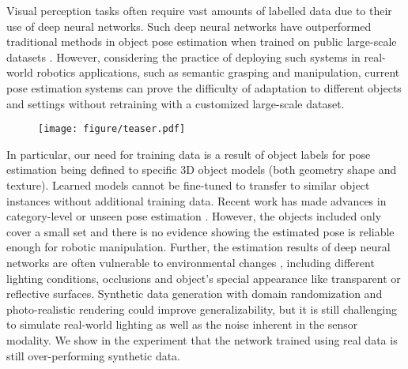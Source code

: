 
Visual perception tasks often require vast amounts of labelled data due to their use of deep neural networks.   Such deep neural networks have outperformed traditional methods in object pose estimation \cite{labbe2020cosypose, he2021ffb6d, hodavn2020bop} when trained on public large-scale datasets \cite{xiang2017posecnn, hodan2017tless, hinterstoisser2012model}. 
However, considering the practice of deploying such systems in real-world robotics applications, such as semantic grasping and manipulation, current pose estimation systems can prove the difficulty of adaptation to different objects and settings without retraining with a customized large-scale dataset.

\begin{figure}
    \centering
    \captionsetup{type=figure}
    \texttt{[image: figure/teaser.pdf]}
    \label{fig:teaser}
\end{figure}

In particular, our need for training data is a result of object labels for pose estimation being defined to specific 3D object models (both geometry shape and texture).  Learned models cannot be fine-tuned to transfer to similar object instances without additional training data. Recent work has made advances in category-level or unseen pose estimation \cite{li2020category, park2020latentfusion}. However, the objects included only cover a small set and there is no evidence showing the estimated pose is reliable enough for robotic manipulation. Further, the estimation results of deep neural networks are often vulnerable to environmental changes \cite{chen2019grip}, including different lighting conditions, occlusions and object's special appearance like transparent or reflective surfaces. Synthetic data generation with domain randomization and photo-realistic rendering \cite{to2018ndds, denninger2019blenderproc} could improve generalizability, but it is still challenging to simulate real-world lighting as well as the noise inherent in the sensor modality. We show in the experiment that the network trained using real data is still over-performing synthetic data.

